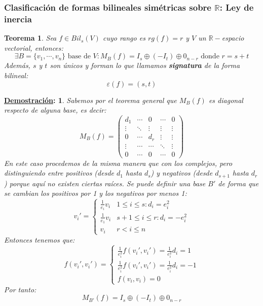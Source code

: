 \documentclass[10pt,a4paper,openright]{book}
\theoremstyle{break}
\newtheorem*{theo}{Teorema}
\newtheorem*{demo}{\underline{Demostración}:}
\begin{document}
\subsubsection{Clasificación de formas bilineales simétricas sobre $\mathbb R$: Ley de inercia}
\begin{theo}
Sea $f\in Bil_s(V)$ cuyo rango es $rg(f)= r$ y $V$ un $\mathbb R -$espacio vectorial, entonces:
$$\exists B =\{v_1, \cdots , v_n\}\mbox{ base de }V: M_B(f) = I_s\oplus (-I_t)\oplus 0_{n-r} \mbox{ donde } r = s+t$$
Además, $s$ y $t$ son únicos y forman lo que llamamos \textbf{signatura} de la forma bilineal:
$$\varepsilon(f) = (s,t)$$
\end{theo}
\begin{demo}
Sabemos por el teorema general que $M_B(f)$ es diagonal respecto de alguna base, es decir:
$$M_B(f)=\begin{pmatrix} d_1 & \cdots & 0 & \cdots & 0 \\ \vdots & \ddots & \vdots & \vdots & \vdots \\ 0 & \cdots & d_r  & \vdots & \vdots \\ \vdots & \cdots & \cdots & \ddots & \vdots \\ 0 & \cdots & 0 & \cdots & 0\end{pmatrix}  $$
En este caso procedemos de la misma manera que con los complejos, pero distinguiendo entre positivos (desde $d_1$ hasta $d_s$) y negativos (desde $d_{s+1}$ hasta $d_r$) porque aquí no existen ciertas raíces. Se puede definir una base $B'$ de forma que se cambian los positivos por 1 y los negativos por menos 1:
$$v_i' =\begin{cases} \frac{1}{e_i}v_i & 1\leq i \leq s: d_i = e_i^2 \\ \frac{1}{e_1}v_i & s+1\leq i \leq r: d_i = -e_i^2 \\ v_i & r< i \leq n\end{cases} $$
Entonces tenemos que:
$$f(v_i', v_i') = \begin{cases} \frac{1}{e_i^2}f(v_i',v_i') = \frac{1}{e_i^2}d_i = 1 \\ \frac{1}{e_i^2}f(v_i',v_i') = \frac{1}{e_i^2}d_i = -1 \\ f(v_i,v_i) = 0\end{cases}$$
Por tanto:
$$M_{B'}(f) = I_s \oplus (-I_t)\oplus 0_{n-r}$$


\end{demo}
\end{document}
